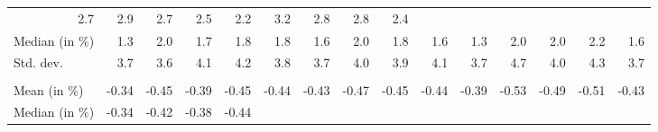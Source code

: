 \begin{tabular}{lllllllllllllll}
  \multicolumn{1}{r}{2.7} &
  \multicolumn{1}{r}{2.9} &
  \multicolumn{1}{r}{2.7} &
  \multicolumn{1}{r}{2.5} &
  \multicolumn{1}{r}{2.2} &
  \multicolumn{1}{r}{3.2} &
  \multicolumn{1}{r}{2.8} &
  \multicolumn{1}{r}{2.8} &
  \multicolumn{1}{r}{2.4} \\
\multicolumn{1}{l}{\hspace{2em}Median (in $\%$)} &
  \multicolumn{1}{|r}{1.3} &
  \multicolumn{1}{r}{2.0} &
  \multicolumn{1}{r}{1.7} &
  \multicolumn{1}{r}{1.8} &
  \multicolumn{1}{r}{1.8} &
  \multicolumn{1}{r}{1.6} &
  \multicolumn{1}{r}{2.0} &
  \multicolumn{1}{r}{1.8} &
  \multicolumn{1}{r}{1.6} &
  \multicolumn{1}{r}{1.3} &
  \multicolumn{1}{r}{2.0} &
  \multicolumn{1}{r}{2.0} &
  \multicolumn{1}{r}{2.2} &
  \multicolumn{1}{r}{1.6} \\
\multicolumn{1}{l}{\hspace{2em}Std. dev.} &
  \multicolumn{1}{|r}{3.7} &
  \multicolumn{1}{r}{3.6} &
  \multicolumn{1}{r}{4.1} &
  \multicolumn{1}{r}{4.2} &
  \multicolumn{1}{r}{3.8} &
  \multicolumn{1}{r}{3.7} &
  \multicolumn{1}{r}{4.0} &
  \multicolumn{1}{r}{3.9} &
  \multicolumn{1}{r}{4.1} &
  \multicolumn{1}{r}{3.7} &
  \multicolumn{1}{r}{4.7} &
  \multicolumn{1}{r}{4.0} &
  \multicolumn{1}{r}{4.3} &
  \multicolumn{1}{r}{3.7} \\
\multicolumn{1}{l}{\hspace{1em}{\textit{Elasticity} ($\widehat{\beta}$)}} &
  \multicolumn{1}{|r}{} &
  \multicolumn{1}{r}{} &
  \multicolumn{1}{r}{} &
  \multicolumn{1}{r}{} &
  \multicolumn{1}{r}{} &
  \multicolumn{1}{r}{} &
  \multicolumn{1}{r}{} &
  \multicolumn{1}{r}{} &
  \multicolumn{1}{r}{} &
  \multicolumn{1}{r}{} &
  \multicolumn{1}{r}{} &
  \multicolumn{1}{r}{} &
  \multicolumn{1}{r}{} &
  \multicolumn{1}{r}{} \\
\multicolumn{1}{l}{\hspace{2em}Mean (in $\%$)} &
  \multicolumn{1}{|r}{-0.34} &
  \multicolumn{1}{r}{-0.45} &
  \multicolumn{1}{r}{-0.39} &
  \multicolumn{1}{r}{-0.45} &
  \multicolumn{1}{r}{-0.44} &
  \multicolumn{1}{r}{-0.43} &
  \multicolumn{1}{r}{-0.47} &
  \multicolumn{1}{r}{-0.45} &
  \multicolumn{1}{r}{-0.44} &
  \multicolumn{1}{r}{-0.39} &
  \multicolumn{1}{r}{-0.53} &
  \multicolumn{1}{r}{-0.49} &
  \multicolumn{1}{r}{-0.51} &
  \multicolumn{1}{r}{-0.43} \\
\multicolumn{1}{l}{\hspace{2em}Median (in $\%$)} &
  \multicolumn{1}{|r}{-0.34} &
  \multicolumn{1}{r}{-0.42} &
  \multicolumn{1}{r}{-0.38} &
  \multicolumn{1}{r}{-0.44} &

\end{tabular}

